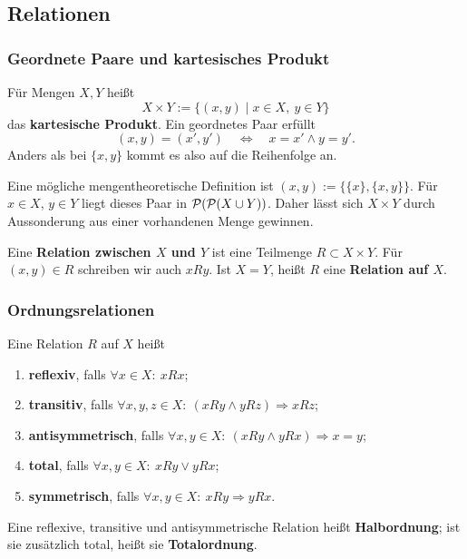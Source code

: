 \subsection{Relationen}

\subsubsection*{Geordnete Paare und kartesisches Produkt}
\begin{definition}
Für Mengen $X,Y$ heißt
\[
    X\times Y:=\{(x,y)\mid x\in X,\ y\in Y\}
\]
das \textbf{kartesische Produkt}. Ein geordnetes Paar erfüllt
\[
    (x,y)=(x',y')\quad\Longleftrightarrow\quad x=x'\land y=y'.
\]
Anders als bei $\{x,y\}$ kommt es also auf die Reihenfolge an.
\end{definition}

\begin{bemerkung}
Eine mögliche mengentheoretische Definition ist
$(x,y):=\{\{x\},\{x,y\}\}$.
Für $x\in X$, $y\in Y$ liegt dieses Paar in
$\mathcal{P}(\mathcal{P}(X\cup Y))$. Daher lässt sich $X\times Y$ durch Aussonderung
aus einer vorhandenen Menge gewinnen.
\end{bemerkung}

\begin{definition}[Relation]
Eine \textbf{Relation zwischen $X$ und $Y$} ist eine Teilmenge
$R\subset X\times Y$. Für $(x,y)\in R$ schreiben wir auch $xRy$.
Ist $X=Y$, heißt $R$ eine \textbf{Relation auf $X$}.
\end{definition}

\subsubsection*{Ordnungsrelationen}
\begin{definition}
Eine Relation $R$ auf $X$ heißt
\begin{enumerate}
    \item \textbf{reflexiv}, falls $\forall x\in X:\ xRx$;
    \item \textbf{transitiv}, falls
    $\forall x,y,z\in X:\ (xRy\land yRz)\Rightarrow xRz$;
    \item \textbf{antisymmetrisch}, falls
    $\forall x,y\in X:\ (xRy\land yRx)\Rightarrow x=y$;
    \item \textbf{total}, falls
    $\forall x,y\in X:\ xRy\lor yRx$;
    \item \textbf{symmetrisch}, falls
    $\forall x,y\in X:\ xRy\Rightarrow yRx$.
\end{enumerate}
Eine reflexive, transitive und antisymmetrische Relation heißt
\textbf{Halbordnung}; ist sie zusätzlich total, heißt sie
\textbf{Totalordnung}.
\end{definition}

